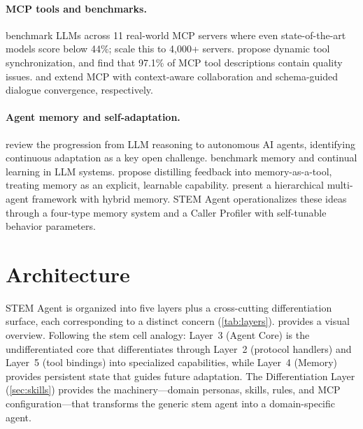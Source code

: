 \documentclass{article}
\begin{document}
\paragraph{MCP tools and benchmarks.}
\citet{luo2025mcpuniverse} benchmark LLMs across 11 real-world MCP servers where even state-of-the-art models score below 44\%; \citet{fan2025mcptoolbench} scale this to 4,000+ servers. \citet{lumer2025scalemcp} propose dynamic tool synchronization, and \citet{hasan2026mcpsmells} find that 97.1\% of MCP tool descriptions contain quality issues. \citet{jayanti2026enhancing} and \citet{schlapbach2026convergence} extend MCP with context-aware collaboration and schema-guided dialogue convergence, respectively.

\paragraph{Agent memory and self-adaptation.}
\citet{ferrag2025agents} review the progression from LLM reasoning to autonomous AI agents, identifying continuous adaptation as a key open challenge. \citet{ai2025memorybench} benchmark memory and continual learning in LLM systems. \citet{gallego2026memoryastool} propose distilling feedback into memory-as-a-tool, treating memory as an explicit, learnable capability. \citet{yadav2026synapse} present a hierarchical multi-agent framework with hybrid memory. STEM Agent operationalizes these ideas through a four-type memory system and a Caller Profiler with self-tunable behavior parameters.

\section{Architecture}
\label{sec:architecture}

STEM Agent is organized into five layers plus a cross-cutting differentiation surface, each corresponding to a distinct concern (\cref{tab:layers}).  provides a visual overview. Following the stem cell analogy: Layer~3 (Agent Core) is the undifferentiated core that differentiates through Layer~2 (protocol handlers) and Layer~5 (tool bindings) into specialized capabilities, while Layer~4 (Memory) provides persistent state that guides future adaptation. The Differentiation Layer (\cref{sec:skills}) provides the machinery---domain personas, skills, rules, and MCP configuration---that transforms the generic stem agent into a domain-specific agent.
\end{document}
